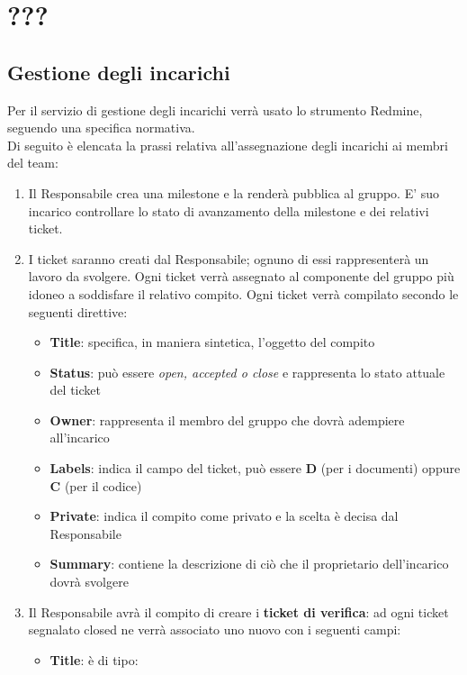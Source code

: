 \section{???}{
	\subsection{Gestione degli incarichi}{
		Per il servizio di gestione degli incarichi verr\`{a} usato lo strumento Redmine, seguendo una specifica normativa.\\Di seguito \`{e} elencata la prassi relativa all’assegnazione degli incarichi ai membri del team:
		\begin{enumerate}
			\item Il Responsabile crea una milestone e la render\`{a} pubblica al gruppo. E’ suo incarico controllare lo stato di avanzamento della milestone e dei relativi ticket.
			\item I ticket saranno creati dal Responsabile; ognuno di essi rappresenter\`{a} un lavoro da svolgere. Ogni ticket verr\`{a} assegnato al componente del gruppo pi\`{u} idoneo a soddisfare il relativo compito. Ogni ticket verr\`{a} compilato secondo le seguenti direttive:
			\begin{itemize}
				\item \textbf{Title}: specifica, in maniera sintetica, l’oggetto del compito
				\item \textbf{Status}: pu\`{o} essere \emph{open, accepted o close} e rappresenta lo stato attuale del ticket
				\item \textbf{Owner}: rappresenta il membro del gruppo che dovr\`{a} adempiere all'incarico
				\item \textbf{Labels}: indica il campo del ticket, pu\`{o} essere \textbf{D} (per i documenti) oppure \textbf{C} (per il codice)
				\item \textbf{Private}: indica il compito come privato e la scelta \`{e} decisa dal Responsabile
				\item \textbf{Summary}: contiene la descrizione di ci\`{o} che il proprietario dell’incarico dovr\`{a} svolgere
			\end{itemize}
			\item Il Responsabile avr\`{a}  il compito di  creare i \textbf{ticket di verifica}: ad ogni ticket segnalato closed ne verr\`{a} associato uno nuovo con i seguenti campi:
			\begin{itemize}
				\item \textbf{Title}: \`{e} di tipo: \begin{center}

\end{center}
\end{itemize}
\end{enumerate}}}
